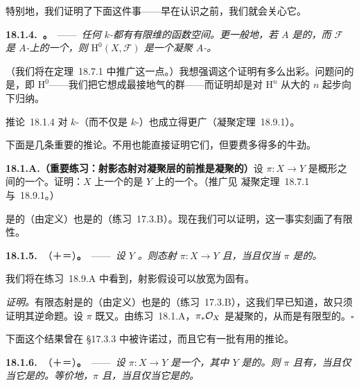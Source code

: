 特别地，我们证明了下面这件事——早在认识\trCohomology{}之前，我们就会关心它。

\textbf{18.1.4.\ \trhCorollary。}\ ——\ \emph{任何\trProjective{} $k$-\trScheme{}都有有限维的函数空间。更一般地，若 $A$ 是\trNoetherian{}的，而 $\mathscr{F}$ 是\trProjective{} $A$-\trScheme{}上的一个\trCoherentSheaf，则 $\mathrm{H}^0(X,\mathscr{F})$ 是一个凝聚 $A$-\trModule。}

（我们将在\mbox{定理~18.7.1} 中推广这一点。）我想强调这个证明有多么出彩。问题问的是\trGlobalSections，即 $\mathrm{H}^0$——我们把它想成最接地气的\trCohomology{}群——而证明却是对 $\mathrm{H}^n$ 从大的 $n$ 起步向下归纳。

\mbox{推论~18.1.4} 对\trProper{} $k$-\trScheme（而不仅是\trProjective{} $k$-\trScheme）也成立得更广（\trGrothendieck{}凝聚定理~18.9.1）。

下面是几条重要的推论。不用\trCohomology{}也能直接证明它们，但要费多得多的牛劲。

\textbf{18.1.A.（重要练习：射影态射对凝聚层的前推是凝聚的）}\quad 设 $\pi\colon X\to Y$ 是\trLocally\trNoetherian{}概形之间的一个\trProjective\trMorphism。证明：$X$ 上一个\trCoherentSheaf{}的\trPushforward{}是 $Y$ 上的一个\trCoherentSheaf。（推广见 \trGrothendieck{}凝聚定理~\mbox{18.7.1} 与~\mbox{18.9.1}。）

\trFinite\trMorphism{}是\trAffine{}的（由定义）也是\trProjective{}的（\mbox{练习~17.3.B}）。现在我们可以证明，这一事实刻画了有限性。

\textbf{18.1.5.\ \trhCorollary}（\trProjective{}＋\trAffine{}＝\trFinite）\textbf{。}\ ——\ \emph{设 $Y$ \trLocally\trNoetherian。则态射 $\pi\colon X\to Y$ \trProjective{}且\trAffine，当且仅当 $\pi$ 是\trFinite{}的。}

我们将在\mbox{练习~18.9.A} 中看到，射影假设可以放宽为固有。

\emph{证明。}\quad 有限态射是\trAffine{}的（由定义）也是\trProjective{}的（\mbox{练习~17.3.B}），这我们早已知道，故只须证明其逆命题。设 $\pi$ 既\trProjective{}又\trAffine。由\mbox{练习~18.1.A}，$\pi_*\mathcal{O}_X$ 是凝聚的，从而是有限型的。\hfill$\square$

下面这个结果曾在 \S17.3.3 中被许诺过，而且它有一批有用的推论。

\textbf{18.1.6.\ \trhTheorem}（\trProjective{}＋\trFinite\trFiber{}＝\trFinite）\textbf{。}\ ——\ \emph{设 $\pi\colon X\to Y$ 是一个\trMorphism，其中 $Y$ 是\trNoetherian{}的。则 $\pi$ \trProjective{}且有\trFinite\trFiber，当且仅当它是\trFinite{}的。等价地，$\pi$ \trProjective{}且\trQuasifinite，当且仅当它是\trFinite{}的。}

